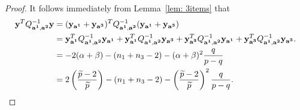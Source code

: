 \documentclass[11pt]{amsart}
\theoremstyle{plain}
\theoremstyle{definition}
\theoremstyle{remark}
\numberwithin{theorem}{section}
\begin{document}
\begin{proof} It follows immediately from Lemma~\ref{lem: 3items} that 
\begin{equation} \label{eq: y}
\begin{split}
{\bf y}^T Q^{-1}_{{\bf a^1}, {\bf a^2}} {\bf y}  & =({\bf y_{a^1}} + {\bf y_{a^3}})^T Q^{-1}_{{\bf a^1}, {\bf a^2}}  ({\bf y_{a^1}} + {\bf y_{a^3}}) \\
 & ={\bf y}^T_{\bf a^1} Q^{-1}_{{\bf a^1}, {\bf a^2}} {\bf y_{a^1}} + {\bf y}^T_{\bf a^1} Q^{-1}_{{\bf a^1}, {\bf a^2}} {\bf y_{a^3}} + {\bf y}^T_{\bf a^3} Q^{-1}_{{\bf a^1}, {\bf a^2}} {\bf y_{a^1}} + {\bf y}^T_{\bf a^3}Q^{-1}_{{\bf a^1}, {\bf a^2}} {\bf y_{a^3}}. \\  
 & = -2 (\alpha + \beta) - (n_1+n_3-2) - (\alpha + \beta)^2 \dfrac{q}{p-q} \\
 & = 2\left(\dfrac{\widetilde{p} -2}{\widetilde{p}} \right)- (n_1+n_3-2) - \left(\dfrac{\widetilde{p} -2}{\widetilde{p}} \right)^2 \dfrac{q}{p-q}.
\end{split}
\end{equation}
\end{proof}
\end{document}
